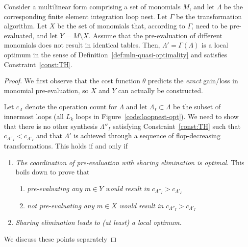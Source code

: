 \begin{Prop}
\label{prop:optimal-approach}
Consider a multilinear form comprising a set of monomials $M$, and let $\Lambda$ be the corresponding finite element integration loop nest. Let $\Gamma$ be the transformation algorithm. Let $X$ be the set of monomials that, according to $\Gamma$, need to be pre-evaluated, and let $Y = M \setminus X$. Assume that the pre-evaluation of different monomials does not result in identical tables. Then, $\Lambda' = \Gamma(\Lambda)$ is a local optimum in the sense of Definition~\ref{def:mln-quasi-optimality} and satisfies Constraint~\ref{const:TH}.
\end{Prop}
\begin{proof}
We first observe that the cost function $\theta$ predicts the \textit{exact} gain/loss in monomial pre-evaluation, so $X$ and $Y$ can actually be constructed.

Let $c_\Lambda$ denote the operation count for $\Lambda$ and let $\Lambda_I \subset \Lambda$ be the subset of innermost loops (all $L_k$ loops in Figure~\ref{code:loopnest-opt}). We need to show that there is no other synthesis $\Lambda''_{I}$ satisfying Constraint~\ref{const:TH} such that $c_{\Lambda''_I} < c_{\Lambda'_I}$ and that $\Lambda'$ is achieved through a sequence of flop-decreasing transformations. This holds if and only if
\begin{enumerate}
\item \textit{The coordination of pre-evaluation with sharing elimination is optimal}. This boils down to prove that
\begin{enumerate}
\item \textit{pre-evaluating any $m \in Y$ would result in $c_{\Lambda''_I} > c_{\Lambda'_I}$}
\item \textit{not pre-evaluating any $m \in X$ would result in $c_{\Lambda''_I} > c_{\Lambda'_I}$}
\end{enumerate}
\item \textit{Sharing elimination leads to (at least) a local optimum.}\\
\end{enumerate}

We discuss these points separately


\end{proof}
